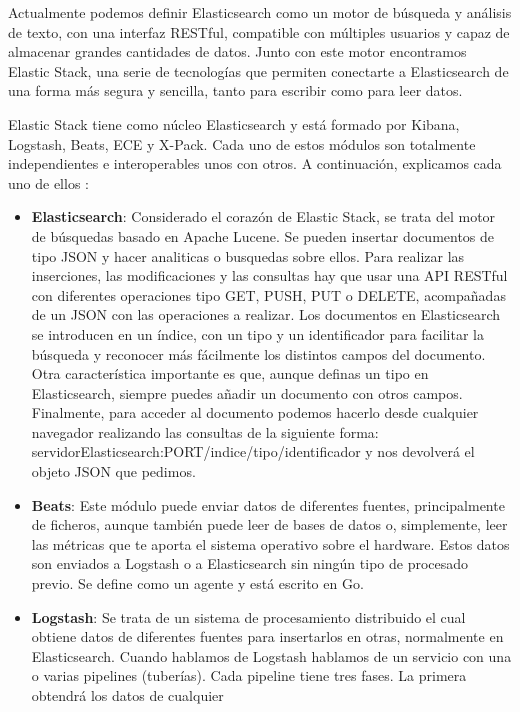 Actualmente podemos definir Elasticsearch como un motor de búsqueda y
análisis de texto, con una interfaz RESTful, compatible con múltiples
usuarios y capaz de almacenar grandes cantidades de datos. Junto con este
motor encontramos Elastic Stack, una serie de tecnologías que permiten
conectarte a Elasticsearch de una forma más segura y sencilla, tanto para
escribir como para leer datos.

Elastic Stack tiene como núcleo Elasticsearch y está formado por Kibana,
Logstash, Beats, ECE y X-Pack. Cada uno de estos módulos son totalmente
independientes e interoperables unos con otros. A continuación, explicamos
cada uno de ellos \cite{Elk-4}:

\begin{itemize}
\item \textbf{Elasticsearch}: Considerado el corazón de Elastic Stack, se
  trata del motor de búsquedas basado en Apache Lucene. Se pueden insertar
  documentos de tipo JSON y hacer analiticas o busquedas sobre ellos. Para
  realizar las inserciones, las modificaciones y las consultas hay que usar
  una API RESTful con diferentes operaciones tipo GET, PUSH, PUT o DELETE,
  acompañadas de un JSON con las operaciones a realizar. Los documentos en
  Elasticsearch se introducen en un índice, con un tipo y un identificador
  para facilitar la búsqueda y reconocer más fácilmente los distintos
  campos del documento. Otra característica importante es que, aunque
  definas un tipo en Elasticsearch, siempre puedes añadir un documento con
  otros campos. Finalmente, para acceder al documento podemos hacerlo desde
  cualquier navegador realizando las consultas de la siguiente forma:
  servidorElasticsearch:PORT/indice/tipo/identificador y nos devolverá el
  objeto JSON que pedimos.
\item \textbf{Beats}: Este módulo puede enviar datos de diferentes fuentes,
  principalmente de ficheros, aunque también puede leer de bases de datos
  o, simplemente, leer las métricas que te aporta el sistema operativo
  sobre el hardware. Estos datos son enviados a Logstash o a Elasticsearch
  sin ningún tipo de procesado previo. Se define como un agente y está
  escrito en Go.
\item \textbf{Logstash}: Se trata de un sistema de procesamiento
  distribuido el cual obtiene datos de diferentes fuentes para insertarlos
  en otras, normalmente en Elasticsearch. Cuando hablamos de Logstash
  hablamos de un servicio con una o varias pipelines (tuberías). Cada
  pipeline tiene tres fases. La primera obtendrá los datos de cualquier

\end{itemize}
